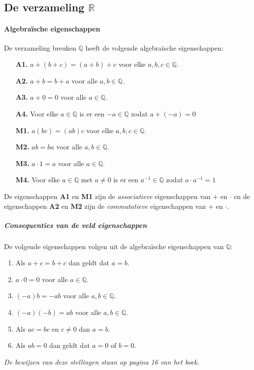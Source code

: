 \subsection{De verzameling \texorpdfstring{$\mathbb{R}$}{R}}
\paragraph{Algebraïsche eigenschappen}De verzameling breuken $\mathbb{Q}$ heeft de volgende algebraïsche eigenschappen:
\begin{itemize}
    \setlength\itemsep{0em}
    \item[\textbf{A1.}] $a+(b+c)=(a+b)+c$ voor elke $a,b,c\in\mathbb{Q}$.
    \item[\textbf{A2.}] $a+b=b+a$ voor alle $a,b\in\mathbb{Q}$.
    \item[\textbf{A3.}] $a+0=0$ voor alle $a\in\mathbb{Q}$.
    \item[\textbf{A4.}] Voor elke $a\in\mathbb{Q}$ is er een $-a\in\mathbb{Q}$ zodat $a+(-a)=0$
    \item[\textbf{M1.}] $a(bc)=(ab)c$ voor elke $a,b,c\in\mathbb{Q}$.
    \item[\textbf{M2.}] $ab=ba$ voor alle $a,b\in\mathbb{Q}$.
    \item[\textbf{M3.}] $a\cdot1=a$ voor alle $a\in\mathbb{Q}$.
    \item[\textbf{M4.}] Voor elke $a\in\mathbb{Q}$ met $a\neq0$ is er een $a^{-1}\in\mathbb{Q}$ zodat $a \cdot a^{-1} = 1$
\end{itemize}
De eigenschappen \textbf{A1} en \textbf{M1} zijn de \textit{associatieve} eigenschappen van $+$ en $\cdot$ en de eigenschappen \textbf{A2} en \textbf{M2} zijn de \textit{commutatieve} eigenschappen van $+$ en $\cdot$.

\subparagraph{Consequenties van de veld eigenschappen} De volgende eigenschappen volgen uit de algebraïsche eigenschappen van $\mathbb{Q}$:

\begin{enumerate}
    \setlength\itemsep{0em}
    \item Als $a+c=b+c$ dan geldt dat $a=b$.
    \item $a\cdot0=0$ voor alle $a\in\mathbb{Q}$.
    \item $(-a)b=-ab$ voor alle $a,b\in\mathbb{Q}$.
    \item $(-a)(-b)=ab$ voor alle $a,b\in\mathbb{Q}$.
    \item Als $ac=bc$ en $c\neq0$ dan $a=b$.
    \item Als $ab=0$ dan geldt dat $a=0$ of $b=0$.
\end{enumerate}
\textit{De bewijzen van deze stellingen staan op pagina 16 van het boek.}

